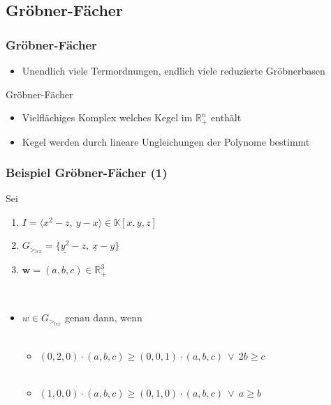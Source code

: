 \documentclass{beamer}
\begin{document}
\subsection{Gröbner-Fächer}


\begin{frame}[fragile]
\frametitle{Gröbner-Fächer}
\begin{itemize}
\item Unendlich viele Termordnungen, endlich viele reduzierte Gröbnerbasen

\end{itemize}

\begin{block}{Gröbner-Fächer}
\begin{itemize}
\item Vielflächiges Komplex welches Kegel im $\mathbb{R}^{n}_{+}$ enthält
\item Kegel werden durch lineare Ungleichungen der Polynome bestimmt 
\end{itemize}

\end{block}

\end{frame}

\begin{frame}[fragile]
\frametitle{Beispiel Gröbner-Fächer (1)}
 Sei 
 \begin{enumerate}
 \item $I = \langle x^{2}-z,~y-x  \rangle \in \mathbb{K}\left[x,y,z\right]  $
 \item $G_{>_{lex}} = \{ \underline{y^{2}}-z,~\underline{x}-y  \} $ 
 \item $\textbf{w}= (a,b,c) \in \mathbb{R}^{3}_{+} $
\end{enumerate}
 
~\\
\begin{itemize}
\item $w \in G_{>_{lex}}$ genau dann, wenn 
~\\
~\\
\begin{itemize}
\item $ \left(0,2,0\right) \cdot \left(a,b,c\right) \geq \left(0,0,1\right) \cdot  \left(a,b,c\right) ~ \vee ~ 2b \geq c  $
~\\
~\\
\item
$ \left(1,0,0\right) \cdot \left(a,b,c\right) \geq \left(0,1,0\right) \cdot  \left(a,b,c\right) ~ \vee ~ a \geq b  $
\end{itemize}
\end{itemize}

\end{frame}
\end{document}
